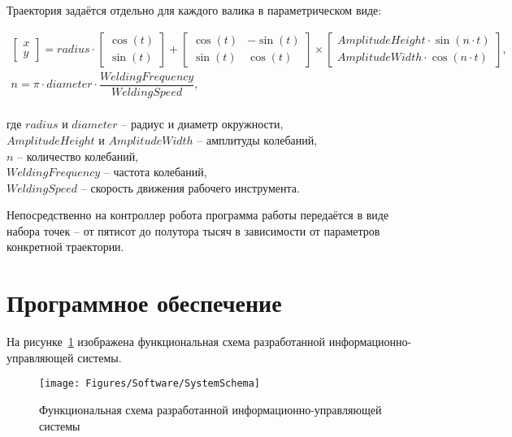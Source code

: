 Траектория задаётся отдельно для каждого валика в параметрическом виде:

\begin{gather*}
    \begin{bmatrix}
        x \\
        y
    \end{bmatrix} = radius \cdot
    \begin{bmatrix}
        \cos(t) \\
        \sin(t)
    \end{bmatrix}
    +
    \begin{bmatrix}
        \cos(t) & -\sin(t) \\
        \sin(t) & \cos(t)
    \end{bmatrix}
    \times
    \begin{bmatrix}
        AmplitudeHeight \cdot \sin(n \cdot t) \\
        AmplitudeWidth \cdot \cos(n \cdot t)
    \end{bmatrix}, \\
    n = \pi \cdot diameter \cdot \dfrac{WeldingFrequency}{WeldingSpeed},
\end{gather*} \\
где $radius$  и $diameter$ -- радиус и диаметр окружности, \\
$AmplitudeHeight$ и $AmplitudeWidth$ -- амплитуды колебаний, \\
$n$ -- количество колебаний, \\
$WeldingFrequency$ -- частота колебаний, \\
$WeldingSpeed$ -- скорость движения рабочего инструмента.

Непосредственно на контроллер робота программа работы передаётся в виде набора точек -- от пятисот до полутора тысяч в зависимости от параметров конкретной траектории.


\section{Программное обеспечение}
На рисунке~\ref{fig:SystemSchema} изображена функциональная схема разработанной информационно-управляющей системы.

\begin{figure}[H]
    \centering
    \vspace{14pt}
    \texttt{[image: Figures/Software/SystemSchema]}
    \caption{Функциональная схема разработанной информационно-управляющей системы}
    \label{fig:SystemSchema}
\end{figure}

